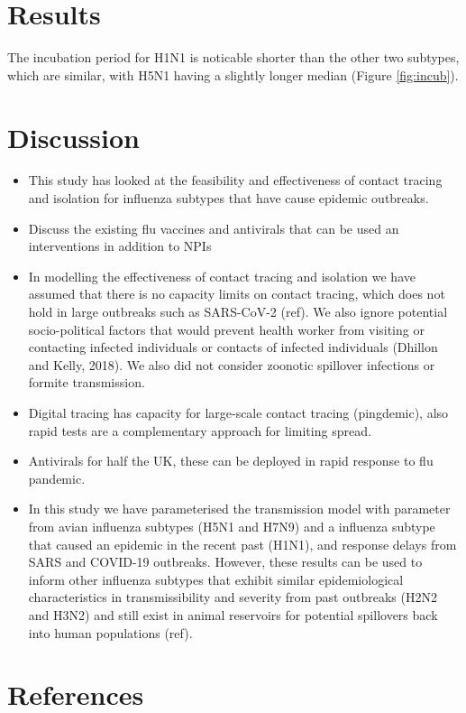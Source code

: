 \documentclass{article}
\begin{document}
\section{Results}

The incubation period for H1N1 is noticable shorter than the other two subtypes, which are similar, with H5N1 having a slightly longer median (Figure \ref{fig:incub}).

\section{Discussion}

\begin{itemize}
\item This study has looked at the feasibility and effectiveness of contact tracing and isolation for influenza subtypes that have cause epidemic outbreaks.
\item Discuss the existing flu vaccines and antivirals that can be used an interventions in addition to NPIs
\item In modelling the effectiveness of contact tracing and isolation we have assumed that there is no capacity limits on contact tracing, which does not hold in large outbreaks such as SARS-CoV-2 (ref). We also ignore potential socio-political factors that would prevent health worker from visiting or contacting infected individuals or contacts of infected individuals (Dhillon and Kelly, 2018). We also did not consider zoonotic spillover infections or formite transmission.
\item Digital tracing has capacity for large-scale contact tracing (pingdemic), also rapid tests are a complementary approach for limiting spread.
\item Antivirals for half the UK, these can be deployed in rapid response to flu pandemic.
\item In this study we have parameterised the transmission model with parameter from avian influenza subtypes (H5N1 and H7N9) and a influenza subtype that caused an epidemic in the recent past (H1N1), and response delays from SARS and COVID-19 outbreaks. However, these results can be used to inform other influenza subtypes that exhibit similar epidemiological characteristics in transmissibility and severity from past outbreaks (H2N2 and H3N2) and still exist in animal reservoirs for potential spillovers back into human populations (ref).
\end{itemize}


\section{References}
\end{document}
